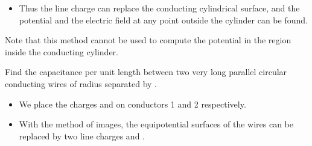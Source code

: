 \begin{ELjoin}

\begin{itemize}
\tightlist
\item
  Thus the line charge \ELim{-\rho_\ell} can replace the conducting cylindrical surface, and the potential and the electric field at any point outside the cylinder can be found.
\end{itemize}

\begin{ELremark}{}

Note that this method cannot be used to compute the potential in the region inside the conducting cylinder.

\end{ELremark}

\end{ELjoin}


\begin{ELexample}{}

Find the capacitance per unit length between two very long parallel circular conducting wires of radius  separated by .


\begin{ELsolution}

\begin{itemize}
\tightlist
\item
  We place the charges  and  on conductors 1 and 2 respectively.
\item
  With the method of images, the equipotential surfaces of the wires can be replaced by two line charges \ELim{+\rho_\ell} and \ELim{-\rho_\ell}.
\end{itemize}


\begin{ELimportant}{}


\end{ELimportant}

\end{ELsolution}

\end{ELexample}

